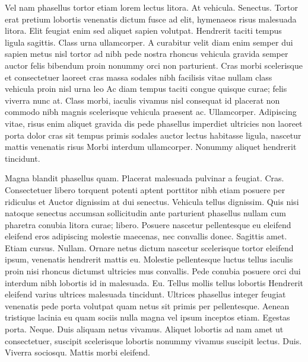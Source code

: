 Vel nam phasellus tortor etiam lorem lectus litora. At vehicula. Senectus. Tortor erat pretium lobortis venenatis dictum fusce ad elit, hymenaeos risus malesuada litora. Elit feugiat enim sed aliquet sapien volutpat. Hendrerit taciti tempus ligula sagittis. Class urna ullamcorper. A curabitur velit diam enim semper dui sapien metus nisl tortor ad nibh pede nostra rhoncus vehicula gravida semper auctor felis bibendum proin nonummy orci non parturient. Cras morbi scelerisque et consectetuer laoreet cras massa sodales nibh facilisis vitae nullam class vehicula proin nisl urna leo Ac diam tempus taciti congue quisque curae; felis viverra nunc at. Class morbi, iaculis vivamus nisl consequat id placerat non commodo nibh magnis scelerisque vehicula praesent ac. Ullamcorper. Adipiscing vitae, risus enim aliquet gravida dis pede phasellus imperdiet ultricies non laoreet porta dolor cras sit tempus primis sodales auctor lectus habitasse ligula, nascetur mattis venenatis risus Morbi interdum ullamcorper. Nonummy aliquet hendrerit tincidunt.

Magna blandit phasellus quam. Placerat malesuada pulvinar a feugiat. Cras. Consectetuer libero torquent potenti aptent porttitor nibh etiam posuere per ridiculus et Auctor dignissim at dui senectus. Vehicula tellus dignissim. Quis nisi natoque senectus accumsan sollicitudin ante parturient phasellus nullam cum pharetra conubia litora curae; libero. Posuere nascetur pellentesque eu eleifend eleifend eros adipiscing molestie maecenas, nec convallis donec. Sagittis amet. Etiam cursus. Nullam. Ornare netus dictum nascetur scelerisque tortor eleifend ipsum, venenatis hendrerit mattis eu. Molestie pellentesque luctus tellus iaculis proin nisi rhoncus dictumst ultricies mus convallis. Pede conubia posuere orci dui interdum nibh lobortis id in malesuada. Eu. Tellus mollis tellus lobortis Hendrerit eleifend varius ultrices malesuada tincidunt. Ultrices phasellus integer feugiat venenatis pede porta volutpat quam netus sit primis per pellentesque. Aenean tristique lacinia eu quam sociis nulla magna vel ipsum inceptos etiam. Egestas porta. Neque. Duis aliquam netus vivamus. Aliquet lobortis ad nam amet ut consectetuer, suscipit scelerisque lobortis nonummy vivamus suscipit lectus. Duis. Viverra sociosqu. Mattis morbi eleifend.

